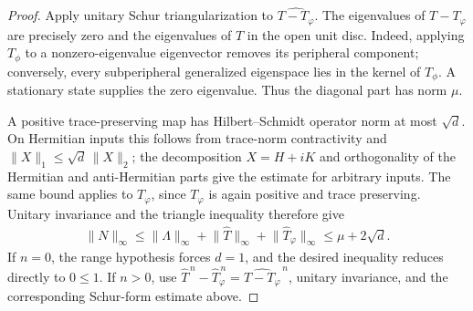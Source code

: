 \begin{proof}
    \leanok
    Apply unitary Schur triangularization to
    $\widehat{T-T_\varphi}$.  The eigenvalues of $T-T_\varphi$ are precisely
    zero and the eigenvalues of $T$ in the open unit disc.  Indeed, applying
    $T_\phi$ to a nonzero-eigenvalue eigenvector removes its peripheral
    component; conversely, every subperipheral generalized eigenspace lies
    in the kernel of $T_\phi$.  A stationary state supplies the zero
    eigenvalue.  Thus the diagonal part has norm $\mu$.

    A positive trace-preserving map has Hilbert--Schmidt operator norm at
    most $\sqrt d$.  On Hermitian inputs this follows from trace-norm
    contractivity and
    $\lVert X\rVert_1\le\sqrt d\,\lVert X\rVert_2$; the decomposition
    $X=H+iK$ and orthogonality of the Hermitian and anti-Hermitian parts give
    the estimate for arbitrary inputs.  The same bound applies to
    $T_\varphi$, since $T_\varphi$ is again positive and trace preserving.
    Unitary invariance and the triangle inequality therefore give
    \begin{align}
      \lVert N\rVert_\infty
      \le \lVert\Lambda\rVert_\infty
        +\lVert\widehat T\rVert_\infty
        +\lVert\widehat T_\varphi\rVert_\infty
      \le \mu+2\sqrt d.
    \end{align}
    If $n=0$, the range hypothesis forces $d=1$, and the desired inequality
    reduces directly to $0\le1$.  If $n>0$, use
    $\widehat T^{\,n}-\widehat T_\varphi^{\,n}
      =\widehat{T-T_\varphi}^{\,n}$,
    unitary invariance, and the corresponding Schur-form estimate above.
\end{proof}

